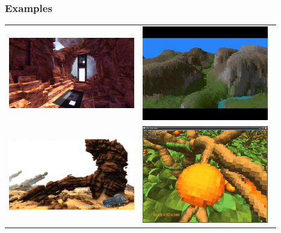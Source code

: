 \documentclass{beamer}
\begin{document}
\subsubsection{Examples}
\begin{frame}
 \begin{center}
  \begin{tabular}{ll}
   \includegraphics[width=5.5cm]{Images/Images_Alexis/voxel_engine3.jpg} &%
   \includegraphics[width=5.5cm]{Images/Images_Alexis/voxel_engine1.jpg} \\
   \includegraphics[width=5.5cm]{Images/Images_Alexis/voxel_engine4.jpg} &%
   \includegraphics[width=5.5cm]{Images/Images_Alexis/voxel_engine2.jpg} \\
  \end{tabular}
 \end{center}
\end{frame}
\end{document}
